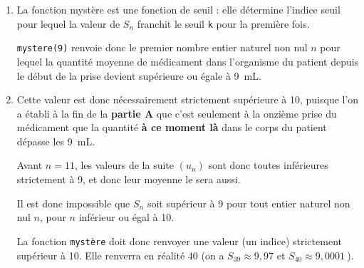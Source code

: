 \documentclass[10pt]{article}
\providecommand{\np}[2][]{{#2~#1}}
\begin{document}
\begin{enumerate}
	\item La fonction mystère est une fonction de seuil : elle détermine l'indice seuil pour lequel la valeur de $S_n$ franchit le seuil \texttt{k} pour la première fois.

	\texttt{mystere(9)} renvoie donc le premier nombre entier naturel non nul $n$ pour lequel la quantité moyenne de médicament dans l'organisme du patient depuis le début de la prise devient supérieure ou égale à \np[mL]{9}.

	\item Cette valeur est donc nécessairement strictement supérieure à 10, puisque l'on a établi à la fin de la \textbf{partie A} que c'est seulement à la onzième prise du médicament que la quantité \textbf{à ce moment là} dans le corps du patient dépasse les \np[mL]{9}.

Avant $n = 11$, les valeurs de la suite $(u_n)$ sont donc toutes inférieures strictement à 9, et donc leur moyenne le sera aussi.

Il est donc impossible que $S_n$ soit supérieur à 9 pour tout entier naturel non nul $n$, pour $n$ inférieur ou égal à 10.

La fonction \texttt{mystère} doit donc renvoyer une valeur (un indice) strictement supérieur à 10. Elle renverra en réalité 40 (on a $S_{39} \approx 9,97$ et $S_{40} \approx \np{9,0001}$).
\end{enumerate}

\medskip
\end{document}
